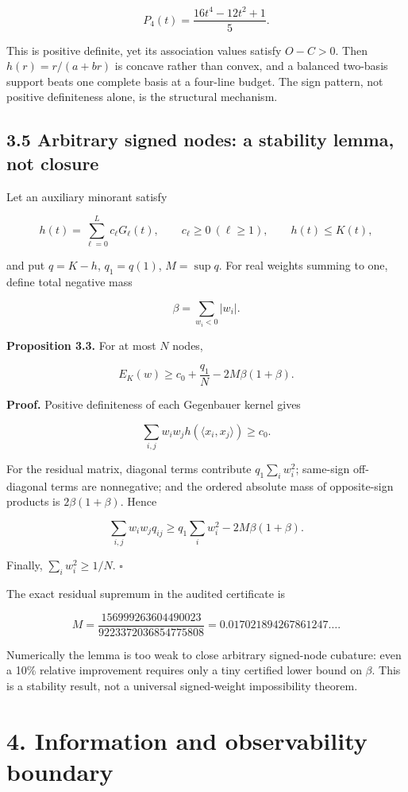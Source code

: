 \documentclass[
  10pt,
]{article}
\begin{document}
\[
P_4(t)=\frac{16t^4-12t^2+1}{5}.
\]

This is positive definite, yet its association values satisfy \(O-C>0\).
Then \(h(r)=r/(a+br)\) is concave rather than convex, and a balanced
two-basis support beats one complete basis at a four-line budget. The
sign pattern, not positive definiteness alone, is the structural
mechanism.

\subsection{3.5 Arbitrary signed nodes: a stability lemma, not
closure}\label{arbitrary-signed-nodes-a-stability-lemma-not-closure}

Let an auxiliary minorant satisfy

\[
h(t)=\sum_{\ell=0}^Lc_\ell G_\ell(t),
\qquad c_\ell\ge0\ (\ell\ge1),
\qquad h(t)\le K(t),
\]

and put \(q=K-h\), \(q_1=q(1)\), \(M=\sup q\). For real weights summing
to one, define total negative mass

\[
\beta=\sum_{w_i<0}|w_i|.
\]

\textbf{Proposition 3.3.} For at most \(N\) nodes,

\[
E_K(w)
\ge
c_0+\frac{q_1}{N}-2M\beta(1+\beta).
\]

\textbf{Proof.} Positive definiteness of each Gegenbauer kernel gives

\[
\sum_{i,j}w_iw_jh(\langle x_i,x_j\rangle)\ge c_0.
\]

For the residual matrix, diagonal terms contribute \(q_1\sum_iw_i^2\);
same-sign off-diagonal terms are nonnegative; and the ordered absolute
mass of opposite-sign products is \(2\beta(1+\beta)\). Hence

\[
\sum_{i,j}w_iw_jq_{ij}
\ge
q_1\sum_iw_i^2-2M\beta(1+\beta).
\]

Finally, \(\sum_iw_i^2\ge1/N\). \(\square\)

The exact residual supremum in the audited certificate is

\[
M=\frac{156999263604490023}{9223372036854775808}
=0.017021894267861247\ldots.
\]

Numerically the lemma is too weak to close arbitrary signed-node
cubature: even a 10\% relative improvement requires only a tiny
certified lower bound on \(\beta\). This is a stability result, not a
universal signed-weight impossibility theorem.

\section{4. Information and observability
boundary}\label{information-and-observability-boundary}
\end{document}
